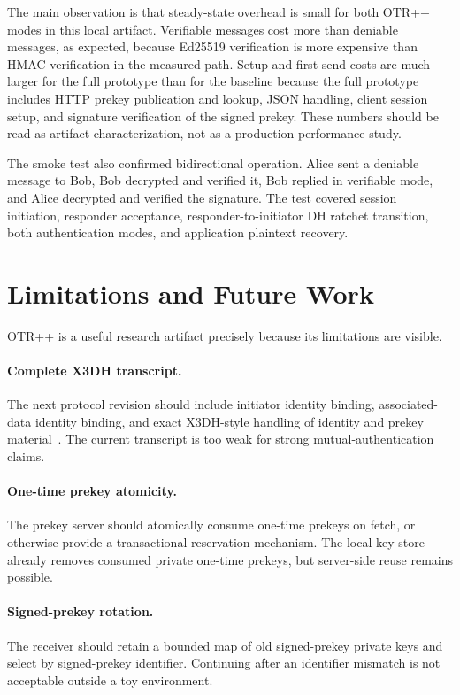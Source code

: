 \documentclass[11pt]{article}
\newcommand{\prot}{OTR++}
\begin{document}
The main observation is that steady-state overhead is small for both \prot{} modes in this local artifact. Verifiable messages cost more than deniable messages, as expected, because Ed25519 verification is more expensive than HMAC verification in the measured path. Setup and first-send costs are much larger for the full prototype than for the baseline because the full prototype includes HTTP prekey publication and lookup, JSON handling, client session setup, and signature verification of the signed prekey. These numbers should be read as artifact characterization, not as a production performance study.

The smoke test also confirmed bidirectional operation. Alice sent a deniable message to Bob, Bob decrypted and verified it, Bob replied in verifiable mode, and Alice decrypted and verified the signature. The test covered session initiation, responder acceptance, responder-to-initiator DH ratchet transition, both authentication modes, and application plaintext recovery.

\section{Limitations and Future Work}

\prot{} is a useful research artifact precisely because its limitations are visible.

\paragraph{Complete X3DH transcript.}
The next protocol revision should include initiator identity binding, associated-data identity binding, and exact X3DH-style handling of identity and prekey material~\cite{signal_x3dh}. The current transcript is too weak for strong mutual-authentication claims.

\paragraph{One-time prekey atomicity.}
The prekey server should atomically consume one-time prekeys on fetch, or otherwise provide a transactional reservation mechanism. The local key store already removes consumed private one-time prekeys, but server-side reuse remains possible.

\paragraph{Signed-prekey rotation.}
The receiver should retain a bounded map of old signed-prekey private keys and select by signed-prekey identifier. Continuing after an identifier mismatch is not acceptable outside a toy environment.
\end{document}
